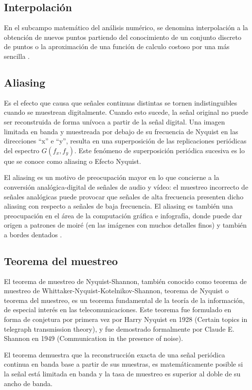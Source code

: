 \documentclass[comsoc, journal]{IEEEtran}
\begin{document}
\subsection{Interpolación}
En el subcampo matemático del análisis numérico, se denomina interpolación a la obtención de nuevos puntos partiendo del conocimiento de un conjunto discreto de puntos o la aproximación de una función de calculo costoso por una más sencilla \cite{crochiere}.

\subsection{Aliasing}
Es el efecto que causa que señales continuas distintas se tornen indistinguibles cuando se muestrean digitalmente. Cuando esto sucede, la señal original no puede ser reconstruida de forma unívoca a partir de la señal digital. Una imagen limitada en banda y muestreada por debajo de su frecuencia de Nyquist en las direcciones ``x'' e ``y'', resulta en una superposición de las replicaciones periódicas del espectro $G(f_x, f_y)$. Este fenómeno de superposición periódica sucesiva es lo que se conoce como aliasing o Efecto Nyquist.

El aliasing es un motivo de preocupación mayor en lo que concierne a la conversión analógica-digital de señales de audio y vídeo: el muestreo incorrecto de señales analógicas puede provocar que señales de alta frecuencia presenten dicho aliasing con respecto a señales de baja frecuencia. El aliasing es también una preocupación en el área de la computación gráfica e infografía, donde puede dar origen a patrones de moiré (en las imágenes con muchos detalles finos) y también a bordes dentados \cite{serway}.

\subsection{Teorema del muestreo}
El teorema de muestreo de Nyquist-Shannon, también conocido como teorema de muestreo de Whittaker-Nyquist-Kotelnikov-Shannon, teorema de Nyquist o teorema del muestreo, es un teorema fundamental de la teoría de la información, de especial interés en las telecomunicaciones. Este teorema fue formulado en forma de conjetura por primera vez por Harry Nyquist en 1928 (Certain topics in telegraph transmission theory), y fue demostrado formalmente por Claude E. Shannon en 1949 (Communication in the presence of noise).

El teorema demuestra que la reconstrucción exacta de una señal periódica continua en banda base a partir de sus muestras, es matemáticamente posible si la señal está limitada en banda y la tasa de muestreo es superior al doble de su ancho de banda.
\end{document}
